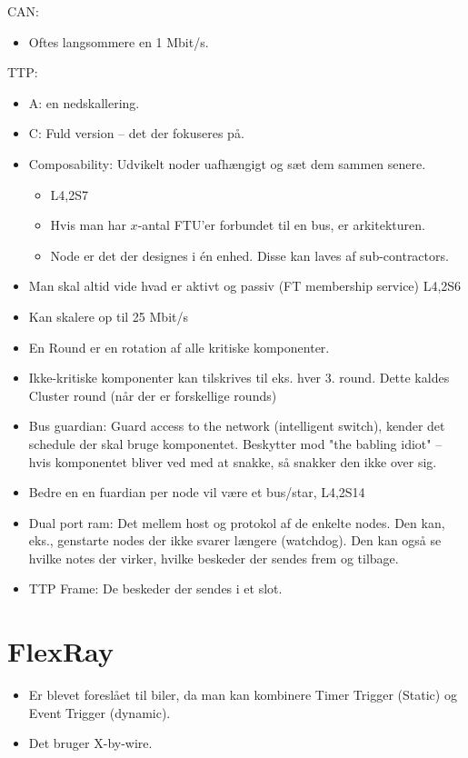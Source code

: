 \documentclass[oneside, 10pt]{article}
\begin{document}
CAN:
\begin{itemize}
	\item Oftes langsommere en 1 Mbit/s.
\end{itemize}

TTP:
\begin{itemize}
	\item A: en nedskallering.
	\item C: Fuld version -- det der fokuseres på.
	\item Composability: Udvikelt noder uafhængigt og sæt dem sammen senere.
	\begin{itemize}
		\item L4,2S7
		\item Hvis man har $x$-antal FTU'er forbundet til en bus, er arkitekturen.
		\item Node er det der designes i én enhed. Disse kan laves af sub-contractors.
	\end{itemize}
	\item Man skal altid vide hvad er aktivt og passiv (FT membership service) L4,2S6
	\item Kan skalere op til 25 Mbit/s
	\item En Round er en rotation af alle kritiske komponenter.
	\item Ikke-kritiske komponenter kan tilskrives til eks. hver 3. round. Dette kaldes Cluster round (når der er forskellige rounds)
	\item Bus guardian: Guard access to the network (intelligent switch), kender det schedule der skal bruge komponentet. Beskytter mod "the babling idiot" -- hvis komponentet bliver ved med at snakke, så snakker den ikke over sig.
	\item Bedre en en fuardian per node vil være et bus/star, L4,2S14

	\item Dual port ram: Det mellem host og protokol af de enkelte nodes. Den kan, eks., genstarte nodes der ikke svarer længere (watchdog). Den kan også se hvilke notes der virker, hvilke beskeder der sendes frem og tilbage.
	\item TTP Frame: De beskeder der sendes i et slot.
\end{itemize}


\section{FlexRay}

\begin{itemize}
	\item Er blevet foreslået til biler, da man kan kombinere Timer Trigger (Static) og Event Trigger (dynamic).
	\item Det bruger X-by-wire.
\end{itemize}
\end{document}
